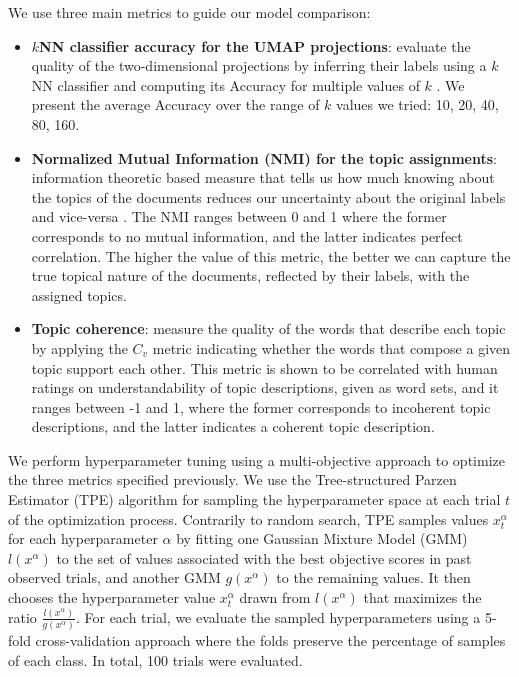 \documentclass[a4paper]{article}
\begin{document}
We use three main metrics to guide our model comparison: 
\begin{itemize}
  \item \textbf{$k$NN classifier accuracy for the UMAP projections}: evaluate the quality of the two-dimensional projections by inferring their labels using a $k$NN classifier and computing its Accuracy for multiple values of $k$ \citep{mcinnes2020}. We present the average Accuracy over the range of $k$ values we tried: 10, 20, 40, 80, 160.
  \item \textbf{Normalized Mutual Information (NMI) for the topic assignments}: information theoretic based measure that tells us how much knowing about the topics of the documents reduces our uncertainty about the original labels and vice-versa \citep{vinh2009}. The NMI ranges between 0 and 1 where the former corresponds to no mutual information, and the latter indicates perfect correlation. The higher the value of this metric, the better we can capture the true topical nature of the documents, reflected by their labels, with the assigned topics.
  \item \textbf{Topic coherence}: measure the quality of the words that describe each topic by applying the $C_v$ metric \citep{roder2015} indicating whether the words that compose a given topic support each other. This metric is shown to be correlated with human ratings on understandability of topic descriptions, given as word sets, and it ranges between -1 and 1, where the former corresponds to incoherent topic descriptions, and the latter indicates a coherent topic description.
\end{itemize}

We perform hyperparameter tuning using a multi-objective approach to optimize the three metrics specified previously. We use the Tree-structured Parzen Estimator (TPE) algorithm \citep{bergstra2011, ozaki2020} for sampling the hyperparameter space at each trial $t$ of the optimization process. Contrarily to random search, TPE samples values $x_t^\alpha$ for each hyperparameter $\alpha$ by fitting one Gaussian Mixture Model (GMM) $l(x^\alpha)$ to the set of values associated with the best objective scores in past observed trials, and another GMM $g(x^\alpha)$ to the remaining values. It then chooses the hyperparameter value $x_t^\alpha$ drawn from $l(x^\alpha)$ that maximizes the ratio $\frac{l(x^\alpha)}{g(x^\alpha)}$. For each trial, we evaluate the sampled hyperparameters using a 5-fold cross-validation approach where the folds preserve the percentage of samples of each class. In total, 100 trials were evaluated.
\end{document}
